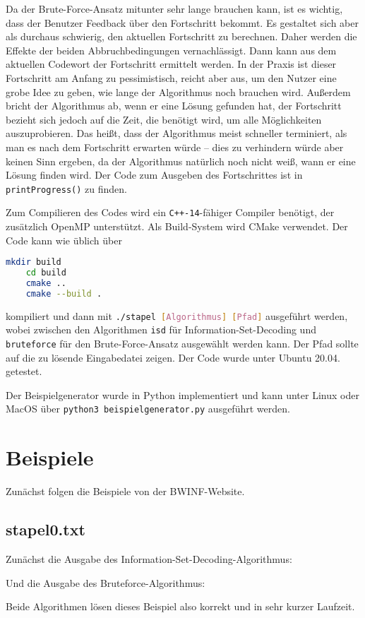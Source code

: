 \documentclass[a4paper,10pt,ngerman]{scrartcl}
\begin{document}
Da der Brute-Force-Ansatz mitunter sehr lange brauchen kann, ist es wichtig, dass der Benutzer Feedback über den Fortschritt bekommt. 
Es gestaltet sich aber als durchaus schwierig, den aktuellen Fortschritt zu berechnen. 
Daher werden die Effekte der beiden Abbruchbedingungen vernachlässigt. 
Dann kann aus dem aktuellen Codewort der Fortschritt ermittelt werden.
In der Praxis ist dieser Fortschritt am Anfang zu pessimistisch, reicht aber aus, um den Nutzer eine grobe Idee zu geben, wie lange der Algorithmus noch brauchen wird. 
Außerdem bricht der Algorithmus ab, wenn er eine Lösung gefunden hat, der Fortschritt bezieht sich jedoch auf die Zeit, die benötigt wird, um alle Möglichkeiten auszuprobieren. 
Das heißt, dass der Algorithmus meist schneller terminiert, als man es nach dem Fortschritt erwarten würde -- dies zu verhindern würde aber keinen Sinn ergeben, da der Algorithmus natürlich noch nicht weiß, wann er eine Lösung finden wird. 
Der Code zum Ausgeben des Fortschrittes ist in \lstinline{printProgress()} zu finden.

Zum Compilieren des Codes wird ein \lstinline{C++-14}-fähiger Compiler benötigt, der zusätzlich OpenMP unterstützt.
Als Build-System wird CMake verwendet. 
Der Code kann wie üblich über 
\begin{lstlisting}[language=bash]
    mkdir build
    cd build
    cmake ..
    cmake --build . 
\end{lstlisting}    
kompiliert und dann mit \lstinline[language=bash]{./stapel [Algorithmus] [Pfad]} ausgeführt werden, wobei zwischen den Algorithmen \lstinline{isd} für Information-Set-Decoding und \lstinline{bruteforce} für den Brute-Force-Ansatz ausgewählt werden kann. Der Pfad sollte auf die zu lösende Eingabedatei zeigen. 
Der Code wurde unter Ubuntu 20.04. getestet.

Der Beispielgenerator wurde in Python implementiert und kann unter Linux oder MacOS über \lstinline[language=bash]{python3 beispielgenerator.py} ausgeführt werden.
\section{Beispiele}
Zunächst folgen die Beispiele von der BWINF-Website.
\subsection*{stapel0.txt}
Zunächst die Ausgabe des Information-Set-Decoding-Algorithmus: 

Und die Ausgabe des Bruteforce-Algorithmus:

Beide Algorithmen lösen dieses Beispiel also korrekt und in sehr kurzer Laufzeit.
\end{document}
